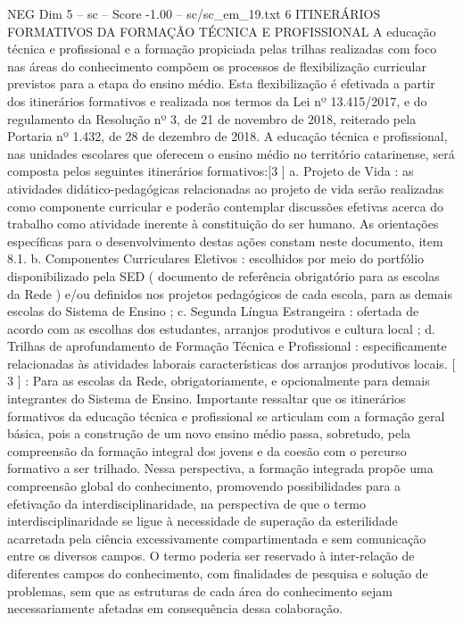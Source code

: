 \begin{textsample}{NEG Dim 5 – sc – Score -1.00 – sc/sc\_em\_19.txt}  \label{ex:f5_neg_256}
6 ITINERÁRIOS FORMATIVOS DA FORMAÇÃO TÉCNICA E PROFISSIONAL A educação técnica e profissional e a formação propiciada pelas trilhas realizadas com foco nas áreas do conhecimento compõem os processos de flexibilização curricular previstos para a etapa do ensino médio.
Esta flexibilização é efetivada a partir dos itinerários formativos e realizada nos termos da Lei nº 13.415/2017, e do regulamento da Resolução nº 3, de 21 de novembro de 2018, reiterado pela Portaria nº 1.432, de 28 de dezembro de 2018.
A educação técnica e profissional, nas unidades escolares que oferecem o ensino médio no território catarinense, será composta pelos seguintes itinerários formativos:[3 ] a.
Projeto de Vida : as atividades didático-pedagógicas relacionadas ao projeto de vida serão realizadas como componente curricular e poderão contemplar discussões efetivas acerca do trabalho como atividade inerente à constituição do ser humano.
As orientações específicas para o desenvolvimento destas ações constam neste documento, item 8.1. b.
Componentes Curriculares Eletivos : escolhidos por meio do portfólio disponibilizado pela SED ( documento de referência obrigatório para as escolas da Rede ) e/ou definidos nos projetos pedagógicos de cada escola, para as demais escolas do Sistema de Ensino ; c.
Segunda Língua Estrangeira : ofertada de acordo com as escolhas dos estudantes, arranjos produtivos e cultura local ; d.
Trilhas de aprofundamento de Formação Técnica e Profissional : especificamente relacionadas às atividades laborais características dos arranjos produtivos locais. [ 3 ] : Para as escolas da Rede, obrigatoriamente, e opcionalmente para demais integrantes do Sistema de Ensino.
Importante ressaltar que os itinerários formativos da educação técnica e profissional se articulam com a formação geral básica, pois a construção de um novo ensino médio passa, sobretudo, pela compreensão da formação integral dos jovens e da coesão com o percurso formativo a ser trilhado.
Nessa perspectiva, a formação integrada propõe uma compreensão global do conhecimento, promovendo possibilidades para a efetivação da interdisciplinaridade, na perspectiva de que o termo interdisciplinaridade se ligue à necessidade de superação da esterilidade acarretada pela ciência excessivamente compartimentada e sem comunicação entre os diversos campos.
O termo poderia ser reservado à inter-relação de diferentes campos do conhecimento, com finalidades de pesquisa e solução de problemas, sem que as estruturas de cada área do conhecimento sejam necessariamente afetadas em consequência dessa colaboração.

\end{textsample}
